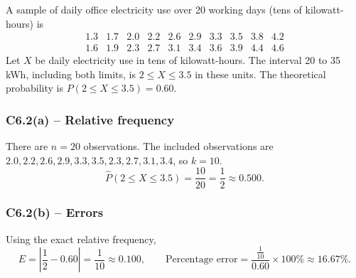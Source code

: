 {
A sample of daily office electricity use over 20 working days (tens of kilowatt-hours) is
\[
\begin{array}{cccccccccc}
1.3&1.7&2.0&2.2&2.6&2.9&3.3&3.5&3.8&4.2\\
1.6&1.9&2.3&2.7&3.1&3.4&3.6&3.9&4.4&4.6
\end{array}
\]
Let $X$ be daily electricity use in tens of kilowatt-hours. The interval
20 to 35 kWh, including both limits, is $2\le X\le3.5$ in these units.
The theoretical probability is $P(2\le X\le3.5)=0.60$.
\label{sol:c6-2a}
\subsubsection*{C6.2(a) -- Relative frequency }
There are $n=20$ observations. The included observations are
$2.0,2.2,2.6,2.9,3.3,3.5,2.3,2.7,3.1,3.4$, so $k=10$.
\[
\widehat P(2\le X\le3.5)=\frac{10}{20}=\frac{1}{2}\approx0.500.
\]
\label{sol:c6-2b}
\subsubsection*{C6.2(b) -- Errors }
Using the exact relative frequency,
\[
E=\left|\frac{1}{2}-0.60\right|=\frac{1}{10}\approx0.100,\qquad
\text{Percentage error}=\frac{\frac{1}{10}}{0.60}\times100\%\approx16.67\%.
\]
\secInicio[sec:c6-2]

}


